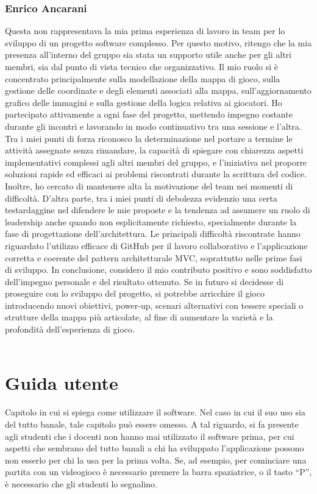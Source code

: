 \documentclass[a4paper,12pt]{report}
\begin{document}
\subsection{Enrico Ancarani}
Questa non rappresentava la mia prima esperienza di lavoro in team per lo sviluppo di un progetto software complesso. 
Per questo motivo, ritengo che la mia presenza all'interno del gruppo sia stata un supporto utile anche per gli altri membri, sia dal punto di vista tecnico che organizzativo.
Il mio ruolo si è concentrato principalmente sulla modellazione della mappa di gioco, sulla gestione delle coordinate e degli elementi associati alla mappa, 
sull’aggiornamento grafico delle immagini e sulla gestione della logica relativa ai giocatori. Ho partecipato attivamente a ogni fase del progetto, mettendo impegno 
costante durante gli incontri e lavorando in modo continuativo tra una sessione e l’altra.
Tra i miei punti di forza riconosco la determinazione nel portare a termine le attività assegnate senza rimandare, la capacità di spiegare con chiarezza aspetti 
implementativi complessi agli altri membri del gruppo, e l'iniziativa nel proporre soluzioni rapide ed efficaci ai problemi riscontrati durante la scrittura del codice. 
Inoltre, ho cercato di mantenere alta la motivazione del team nei momenti di difficoltà.
D’altra parte, tra i miei punti di debolezza evidenzio una certa testardaggine nel difendere le mie proposte e la tendenza ad assumere un ruolo di leadership anche 
quando non esplicitamente richiesto, specialmente durante la fase di progettazione dell’architettura.
Le principali difficoltà riscontrate hanno riguardato l’utilizzo efficace di GitHub per il lavoro collaborativo e l’applicazione corretta e coerente del pattern 
architetturale MVC, soprattutto nelle prime fasi di sviluppo.
In conclusione, considero il mio contributo positivo e sono soddisfatto dell’impegno personale e del risultato ottenuto. 
Se in futuro si decidesse di proseguire con lo sviluppo del progetto, si potrebbe arricchire il gioco introducendo nuovi obiettivi, 
power-up, scenari alternativi con tessere speciali o strutture della mappa più articolate, al fine di aumentare la varietà e la profondità dell’esperienza di gioco.
\\
\\
\appendix
\chapter{Guida utente}

Capitolo in cui si spiega come utilizzare il software. Nel caso in cui il suo uso sia del tutto
banale, tale capitolo può essere omesso.
%
A tal riguardo, si fa presente agli studenti che i docenti non hanno mai utilizzato il software
prima, per cui aspetti che sembrano del tutto banali a chi ha sviluppato l'applicazione possono non
esserlo per chi la usa per la prima volta.
%
Se, ad esempio, per cominciare una partita con un videogioco è necessario premere la barra
spaziatrice, o il tasto ``P'', è necessario che gli studenti lo segnalino.
\end{document}
